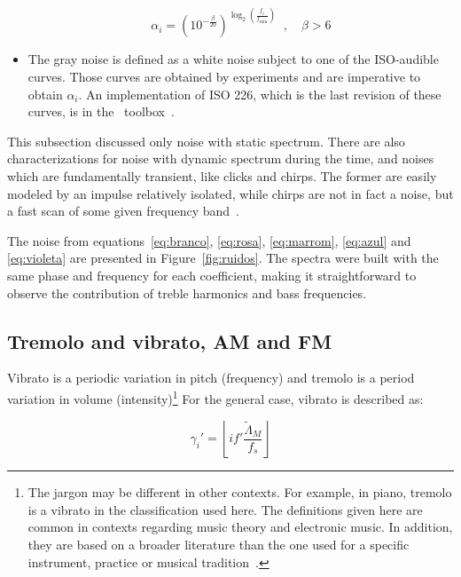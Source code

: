 \begin{itemize}
\begin{equation}\label{eq:preto}
 \alpha_i=(10^{-\frac{\beta}{20}})^{\log _2 \left( \frac{f_i}{f_{\text{min}}} \right )}\;\;, \quad \beta > 6
\end{equation}

 \item The gray noise is defined as a white noise subject to one of the ISO-audible curves. Those curves are obtained by experiments and are imperative to obtain $\alpha_i$. An implementation of ISO 226, which is the last revision of these curves, is in the \massa\ toolbox~\cite{MASSA}.

\end{itemize}

This subsection discussed only noise with static spectrum. There are also characterizations for noise with dynamic spectrum during the time, and noises which are fundamentally transient, like clicks and chirps. The former are easily modeled by an impulse relatively isolated, while chirps are not in fact a noise, but a fast scan of some given frequency band~\cite{Cook}.

The noise from equations~\ref{eq:branco}, \ref{eq:rosa}, \ref{eq:marrom},
\ref{eq:azul} and \ref{eq:violeta} are presented in Figure~\ref{fig:ruidos}. The spectra were built with the same phase and frequency for each coefficient, making it straightforward to observe the contribution of treble harmonics and bass frequencies.


\subsection{Tremolo and vibrato, AM and FM}\label{subsec:tvaf}

Vibrato is a periodic variation in pitch (frequency) and tremolo is a period variation in volume (intensity)\footnote{The jargon may be different in other contexts. For example, in piano, tremolo is a vibrato in the classification used here. The definitions given here are common in contexts regarding music theory and electronic music. In addition, they are based on a broader literature than the one used for a specific instrument, practice or musical tradition~\cite{Lacerda,Harmonia}.}
For the general case, vibrato is described as:

\begin{equation}\label{vbrGamma}
 \gamma_i'=\left \lfloor i f' \frac{\widetilde{\Lambda}_M}{f_s} \right \rfloor
\end{equation}

